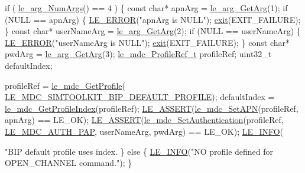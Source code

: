\begin{DoxyCodeInclude}
{{{{{{        \textcolor{keywordflow}{if} ( \hyperlink{le__args_8h_a6fbbeb423104e6eb92fe47ef42b7310a}{le\_arg\_NumArgs}() == 4 )
        \{
            \textcolor{keyword}{const} \textcolor{keywordtype}{char}*         apnArg = \hyperlink{le__args_8h_a5ebca8229facd069785639cb3c1e273a}{le\_arg\_GetArg}(1);
            \textcolor{keywordflow}{if} (NULL == apnArg)
            \{
                \hyperlink{le__log_8h_a353590f91b3143a7ba3a416ae5a50c3d}{LE\_ERROR}(\textcolor{stringliteral}{"apnArg is NULL"});
                \hyperlink{app_stop_client_8c_a310220604a584e112ba8f7aa3dfe23f1}{exit}(EXIT\_FAILURE);
            \}
            \textcolor{keyword}{const} \textcolor{keywordtype}{char}*         userNameArg = \hyperlink{le__args_8h_a5ebca8229facd069785639cb3c1e273a}{le\_arg\_GetArg}(2);
            \textcolor{keywordflow}{if} (NULL == userNameArg)
            \{
                \hyperlink{le__log_8h_a353590f91b3143a7ba3a416ae5a50c3d}{LE\_ERROR}(\textcolor{stringliteral}{"userNameArg is NULL"});
                \hyperlink{app_stop_client_8c_a310220604a584e112ba8f7aa3dfe23f1}{exit}(EXIT\_FAILURE);
            \}
            \textcolor{keyword}{const} \textcolor{keywordtype}{char}*         pwdArg = \hyperlink{le__args_8h_a5ebca8229facd069785639cb3c1e273a}{le\_arg\_GetArg}(3);
            \hyperlink{le__mdc__interface_8h_a91074d8f0d88c6645e3085dfadf87011}{le\_mdc\_ProfileRef\_t} profileRef;
            uint32\_t            defaultIndex;

            profileRef = \hyperlink{le__mdc__interface_8h_a638b693cd5f644fa5c24f81e1e36483c}{le\_mdc\_GetProfile}(
      \hyperlink{le__mdc__interface_8h_ac7b1c4304ae2d46c60fc6d7506313161}{LE\_MDC\_SIMTOOLKIT\_BIP\_DEFAULT\_PROFILE});
            defaultIndex = \hyperlink{le__mdc__interface_8h_a108f7c3db74a377c2ae5482543d4e0d9}{le\_mdc\_GetProfileIndex}(profileRef);
            \hyperlink{le__log_8h_ac0dbbef91dc0fed449d0092ff0557b39}{LE\_ASSERT}(\hyperlink{le__mdc__interface_8h_ae8ebd11b9cb9afb9b6b5745903f50156}{le\_mdc\_SetAPN}(profileRef, apnArg) == LE\_OK);
            \hyperlink{le__log_8h_ac0dbbef91dc0fed449d0092ff0557b39}{LE\_ASSERT}(\hyperlink{le__mdc__interface_8h_a9f69d0751927b5ead6c756202179b222}{le\_mdc\_SetAuthentication}(profileRef,
                                               \hyperlink{le__mdc__interface_8h_ae9758eecfab89fbc1bc01341393a7723a151065be441aa8f065d0ead3d739b6f0}{LE\_MDC\_AUTH\_PAP},
                                               userNameArg,
                                               pwdArg) == LE\_OK);
            \hyperlink{le__log_8h_a23e6d206faa64f612045d688cdde5808}{LE\_INFO}(\textcolor{stringliteral}{"BIP default profile uses index.%
        \}
        \textcolor{keywordflow}{else}
        \{
            \hyperlink{le__log_8h_a23e6d206faa64f612045d688cdde5808}{LE\_INFO}(\textcolor{stringliteral}{"NO profile defined for OPEN\_CHANNEL command."});
        \}

}}}}}}}
\end{DoxyCodeInclude}
